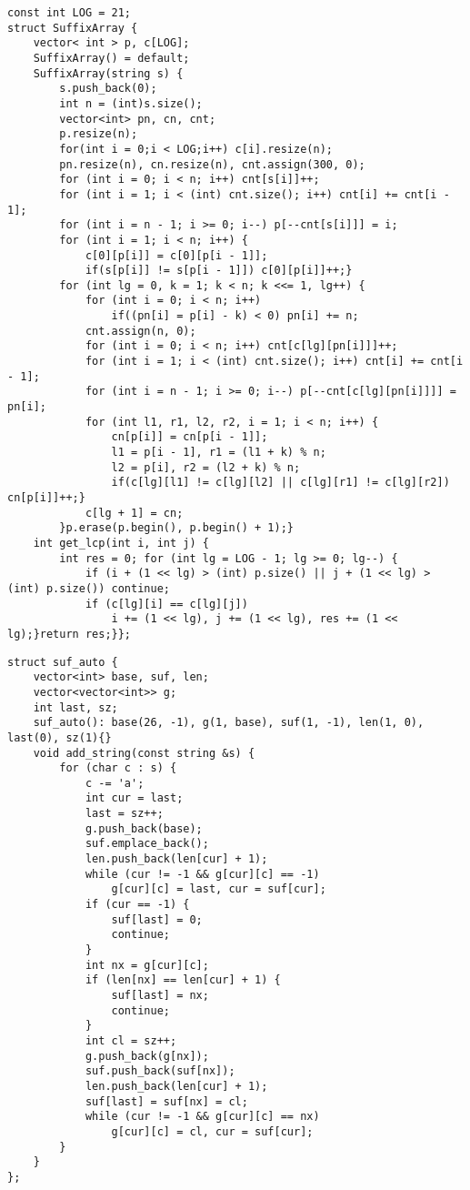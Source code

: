 \documentclass[12pt]{article}
\begin{document}
\begin{verbatim}
const int LOG = 21;
struct SuffixArray {
    vector< int > p, c[LOG];
    SuffixArray() = default;
    SuffixArray(string s) {
        s.push_back(0);
        int n = (int)s.size();
        vector<int> pn, cn, cnt;
        p.resize(n);
        for(int i = 0;i < LOG;i++) c[i].resize(n);
        pn.resize(n), cn.resize(n), cnt.assign(300, 0);
        for (int i = 0; i < n; i++) cnt[s[i]]++;
        for (int i = 1; i < (int) cnt.size(); i++) cnt[i] += cnt[i - 1];
        for (int i = n - 1; i >= 0; i--) p[--cnt[s[i]]] = i;
        for (int i = 1; i < n; i++) {
            c[0][p[i]] = c[0][p[i - 1]];
            if(s[p[i]] != s[p[i - 1]]) c[0][p[i]]++;}
        for (int lg = 0, k = 1; k < n; k <<= 1, lg++) {
            for (int i = 0; i < n; i++)
                if((pn[i] = p[i] - k) < 0) pn[i] += n;
            cnt.assign(n, 0);
            for (int i = 0; i < n; i++) cnt[c[lg][pn[i]]]++;
            for (int i = 1; i < (int) cnt.size(); i++) cnt[i] += cnt[i - 1];
            for (int i = n - 1; i >= 0; i--) p[--cnt[c[lg][pn[i]]]] = pn[i];
            for (int l1, r1, l2, r2, i = 1; i < n; i++) {
                cn[p[i]] = cn[p[i - 1]];
                l1 = p[i - 1], r1 = (l1 + k) % n;
                l2 = p[i], r2 = (l2 + k) % n;
                if(c[lg][l1] != c[lg][l2] || c[lg][r1] != c[lg][r2]) cn[p[i]]++;}
            c[lg + 1] = cn;
        }p.erase(p.begin(), p.begin() + 1);}
    int get_lcp(int i, int j) {
        int res = 0; for (int lg = LOG - 1; lg >= 0; lg--) {
            if (i + (1 << lg) > (int) p.size() || j + (1 << lg) > (int) p.size()) continue;
            if (c[lg][i] == c[lg][j])
                i += (1 << lg), j += (1 << lg), res += (1 << lg);}return res;}};
\end{verbatim}

\begin{verbatim}
struct suf_auto {
    vector<int> base, suf, len;
    vector<vector<int>> g;
    int last, sz;
    suf_auto(): base(26, -1), g(1, base), suf(1, -1), len(1, 0), last(0), sz(1){}
    void add_string(const string &s) {
        for (char c : s) {
            c -= 'a';
            int cur = last;
            last = sz++;
            g.push_back(base);
            suf.emplace_back();
            len.push_back(len[cur] + 1);
            while (cur != -1 && g[cur][c] == -1)
                g[cur][c] = last, cur = suf[cur];
            if (cur == -1) {
                suf[last] = 0;
                continue;
            }
            int nx = g[cur][c];
            if (len[nx] == len[cur] + 1) {
                suf[last] = nx;
                continue;
            }
            int cl = sz++;
            g.push_back(g[nx]);
            suf.push_back(suf[nx]);
            len.push_back(len[cur] + 1);
            suf[last] = suf[nx] = cl;
            while (cur != -1 && g[cur][c] == nx)
                g[cur][c] = cl, cur = suf[cur];
        }
    }
};
\end{verbatim}
\end{document}
